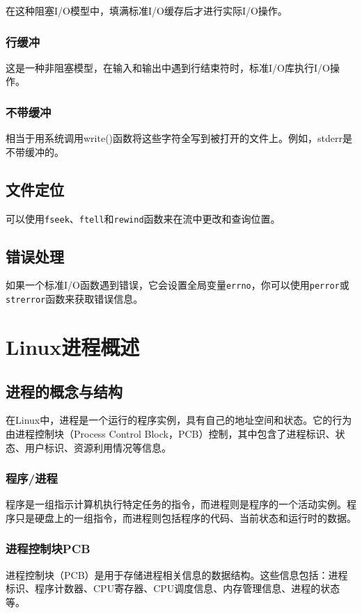 \documentclass[12pt, a4paper, oneside]{ctexbook}
\numberwithin{figure}{section}
\begin{document}
在这种阻塞I/O模型中，填满标准I/O缓存后才进行实际I/O操作。

\subsubsection{行缓冲}

这是一种非阻塞模型，在输入和输出中遇到行结束符时，标准I/O库执行I/O操作。

\subsubsection{不带缓冲}

相当于用系统调用write()函数将这些字符全写到被打开的文件上。例如，stderr是不带缓冲的。

\subsection{文件定位}

可以使用\texttt{fseek}、\texttt{ftell}和\texttt{rewind}函数来在流中更改和查询位置。

\subsection{错误处理}

如果一个标准I/O函数遇到错误，它会设置全局变量\texttt{errno}，你可以使用\texttt{perror}或\texttt{strerror}函数来获取错误信息。

\section{Linux进程概述}

\subsection{进程的概念与结构}
在Linux中，进程是一个运行的程序实例，具有自己的地址空间和状态。它的行为由进程控制块（Process Control Block，PCB）控制，其中包含了进程标识、状态、用户标识、资源利用情况等信息。

\subsubsection{程序/进程}
程序是一组指示计算机执行特定任务的指令，而进程则是程序的一个活动实例。程序只是硬盘上的一组指令，而进程则包括程序的代码、当前状态和运行时的数据。

\subsubsection{进程控制块PCB}
进程控制块（PCB）是用于存储进程相关信息的数据结构。这些信息包括：进程标识、程序计数器、CPU寄存器、CPU调度信息、内存管理信息、进程的状态等。
\end{document}
